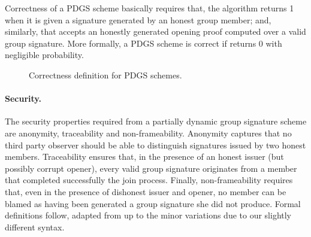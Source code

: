 Correctness of a PDGS scheme basically requires that, the \PDGSVerify algorithm
returns 1 when it is given a signature generated by an honest group member; and,
similarly, that \PDGSJudge accepts an honestly generated opening proof computed
over a valid group signature. More formally, a PDGS scheme is correct if
\PDGSExpCorrect returns 0 with negligible probability.

\begin{figure}[ht!]
  \begin{center}
  \end{center}
  \caption{Correctness definition for PDGS schemes.
    }
  \label{fig:pdgscorr}
\end{figure}

\paragraph{Security.} %

The security properties required from a partially dynamic group signature scheme
are anonymity, traceability and non-frameability. Anonymity captures that no
third party observer should be able to distinguish signatures issued by two
honest members. Traceability ensures that, in the presence of an honest issuer
(but possibly corrupt opener), every valid group signature originates from a
member that completed successfully the join process. Finally, non-frameability
requires that, even in the presence of dishonest issuer and opener, no member
can be blamed as having been generated a group signature she did not produce.
Formal definitions follow, adapted from \cite{bsz05} up to the minor variations
due to our slightly different syntax.


